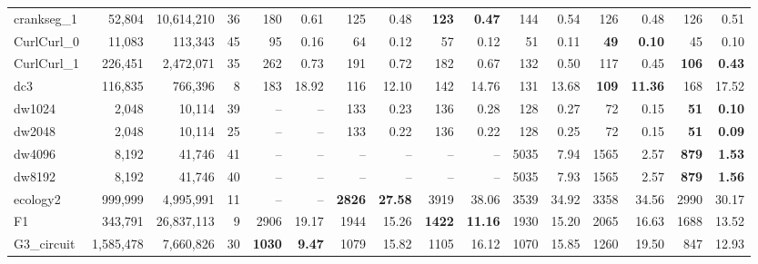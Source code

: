 \begin{landscape}
\begin{table}
\begin{tabular}{lrrr||rr|rr|rr|rr|rr|rr}
	          crankseg\_1	&	52,804	&	10,614,210	&	36  &      180 &     0.61  &      125 &     0.48  & \textbf{     123} & \textbf{    0.47}  &      144 &     0.54  &      126 &     0.48  &      126 &     0.51\\
	          CurlCurl\_0	&	11,083	&	113,343	&	45  &       95 &     0.16  &       64 &     0.12  &       57 &     0.12  &       51 &     0.11  & \textbf{      49} & \textbf{    0.10}  &       45 &     0.10\\
	          CurlCurl\_1	&	226,451	&	2,472,071	&	35  &      262 &     0.73  &      191 &     0.72  &      182 &     0.67  &      132 &     0.50  &      117 &     0.45  & \textbf{     106} & \textbf{    0.43}\\
	                 dc3	&	116,835	&	766,396	&	8  &      183 &    18.92  &      116 &    12.10  &      142 &    14.76  &      131 &    13.68  & \textbf{     109} & \textbf{   11.36}  &      168 &    17.52\\
	              dw1024	&	2,048	&	10,114	&	39  &      --  &      --   &      133 &     0.23  &      136 &     0.28  &      128 &     0.27  &       72 &     0.15  & \textbf{      51} & \textbf{    0.10}\\
	              dw2048	&	2,048	&	10,114	&	25  &      --  &      --   &      133 &     0.22  &      136 &     0.22  &      128 &     0.25  &       72 &     0.15  & \textbf{      51} & \textbf{    0.09}\\
	              dw4096	&	8,192	&	41,746	&	41  &      --  &      --   &      --  &      --   &      --  &      --   &     5035 &     7.94  &     1565 &     2.57  & \textbf{     879} & \textbf{    1.53}\\
	              dw8192	&	8,192	&	41,746	&	40  &      --  &      --   &      --  &      --   &      --  &      --   &     5035 &     7.93  &     1565 &     2.57  & \textbf{     879} & \textbf{    1.56}\\
	            ecology2	&	999,999	&	4,995,991	&	11  &      --  &      --   & \textbf{    2826} & \textbf{   27.58}  &     3919 &    38.06  &     3539 &    34.92  &     3358 &    34.56  &     2990 &    30.17\\
	                  F1	&	343,791	&	26,837,113	&	9  &     2906 &    19.17  &     1944 &    15.26  & \textbf{    1422} & \textbf{   11.16}  &     1930 &    15.20  &     2065 &    16.63  &     1688 &    13.52\\
	          G3\_circuit	&	1,585,478	&	7,660,826	&	30  & \textbf{    1030} & \textbf{    9.47}  &     1079 &    15.82  &     1105 &    16.12  &     1070 &    15.85  &     1260 &    19.50  &      847 &    12.93\\

\end{tabular}
\end{table}
\end{landscape}
